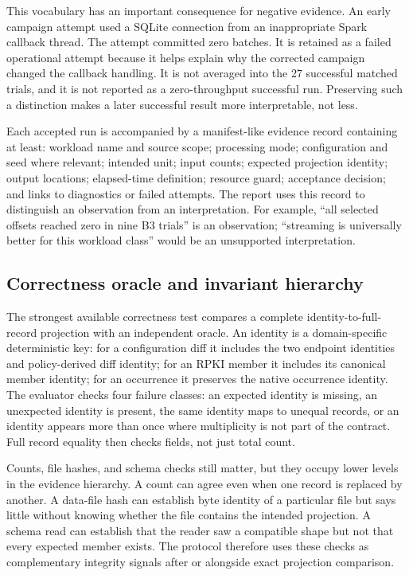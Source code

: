 \documentclass[a4paper,11pt]{article}
\begin{document}
This vocabulary has an important consequence for negative evidence. An early campaign attempt used a SQLite connection from an inappropriate Spark callback thread. The attempt committed zero batches. It is retained as a failed operational attempt because it helps explain why the corrected campaign changed the callback handling. It is not averaged into the 27 successful matched trials, and it is not reported as a zero-throughput successful run. Preserving such a distinction makes a later successful result more interpretable, not less.

Each accepted run is accompanied by a manifest-like evidence record containing at least: workload name and source scope; processing mode; configuration and seed where relevant; intended unit; input counts; expected projection identity; output locations; elapsed-time definition; resource guard; acceptance decision; and links to diagnostics or failed attempts. The report uses this record to distinguish an observation from an interpretation. For example, ``all selected offsets reached zero in nine B3 trials'' is an observation; ``streaming is universally better for this workload class'' would be an unsupported interpretation.

\subsection{Correctness oracle and invariant hierarchy}

The strongest available correctness test compares a complete identity-to-full-record projection with an independent oracle. An identity is a domain-specific deterministic key: for a configuration diff it includes the two endpoint identities and policy-derived diff identity; for an RPKI member it includes its canonical member identity; for an occurrence it preserves the native occurrence identity. The evaluator checks four failure classes: an expected identity is missing, an unexpected identity is present, the same identity maps to unequal records, or an identity appears more than once where multiplicity is not part of the contract. Full record equality then checks fields, not just total count.

Counts, file hashes, and schema checks still matter, but they occupy lower levels in the evidence hierarchy. A count can agree even when one record is replaced by another. A data-file hash can establish byte identity of a particular file but says little without knowing whether the file contains the intended projection. A schema read can establish that the reader saw a compatible shape but not that every expected member exists. The protocol therefore uses these checks as complementary integrity signals after or alongside exact projection comparison.
\end{document}
